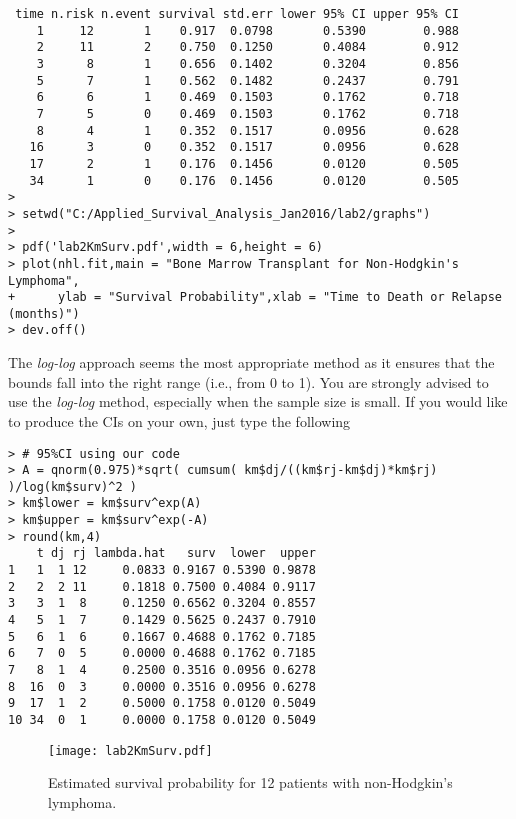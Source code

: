 \begin{enumerate}[(a)]
\begin{footnotesize}
\begin{verbatim}
 time n.risk n.event survival std.err lower 95% CI upper 95% CI
    1     12       1    0.917  0.0798       0.5390        0.988
    2     11       2    0.750  0.1250       0.4084        0.912
    3      8       1    0.656  0.1402       0.3204        0.856
    5      7       1    0.562  0.1482       0.2437        0.791
    6      6       1    0.469  0.1503       0.1762        0.718
    7      5       0    0.469  0.1503       0.1762        0.718
    8      4       1    0.352  0.1517       0.0956        0.628
   16      3       0    0.352  0.1517       0.0956        0.628
   17      2       1    0.176  0.1456       0.0120        0.505
   34      1       0    0.176  0.1456       0.0120        0.505
> 
> setwd("C:/Applied_Survival_Analysis_Jan2016/lab2/graphs")
> 
> pdf('lab2KmSurv.pdf',width = 6,height = 6)
> plot(nhl.fit,main = "Bone Marrow Transplant for Non-Hodgkin's Lymphoma",
+      ylab = "Survival Probability",xlab = "Time to Death or Relapse (months)")
> dev.off()
\end{verbatim}
\end{footnotesize}
The \emph{log-log} approach seems the most appropriate method as it ensures that the bounds fall into the right range (i.e., from 0 to 1). You are strongly advised to use the \emph{log-log} method, especially when the sample size is small.
If you would like to produce the CIs on your own, just type the following
\begin{footnotesize}
\begin{verbatim}
> # 95%CI using our code
> A = qnorm(0.975)*sqrt( cumsum( km$dj/((km$rj-km$dj)*km$rj) )/log(km$surv)^2 )
> km$lower = km$surv^exp(A)
> km$upper = km$surv^exp(-A)
> round(km,4)
    t dj rj lambda.hat   surv  lower  upper
1   1  1 12     0.0833 0.9167 0.5390 0.9878
2   2  2 11     0.1818 0.7500 0.4084 0.9117
3   3  1  8     0.1250 0.6562 0.3204 0.8557
4   5  1  7     0.1429 0.5625 0.2437 0.7910
5   6  1  6     0.1667 0.4688 0.1762 0.7185
6   7  0  5     0.0000 0.4688 0.1762 0.7185
7   8  1  4     0.2500 0.3516 0.0956 0.6278
8  16  0  3     0.0000 0.3516 0.0956 0.6278
9  17  1  2     0.5000 0.1758 0.0120 0.5049
10 34  0  1     0.0000 0.1758 0.0120 0.5049
\end{verbatim}
\end{footnotesize}
\begin{figure}[htbp]
	\centering
		\texttt{[image: lab2KmSurv.pdf]}
	\caption{Estimated survival probability for 12 patients
with non-Hodgkin’s lymphoma.}
	\label{figure1}
\end{figure}

\end{enumerate}
